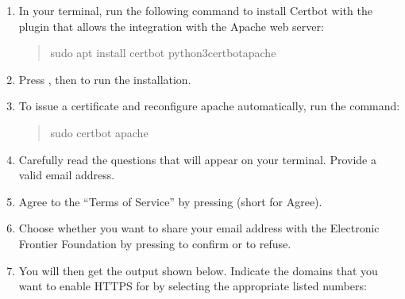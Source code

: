 \documentclass[a4paper,10pt,english,openany,oneside]{sphinxmanual}
\begin{document}
\begin{enumerate}
%
\item {} 
\sphinxAtStartPar
In your terminal, run the following command to install Certbot with the plugin that allows the integration with the Apache web server:
\begin{quote}

\begin{sphinxVerbatim}[commandchars=\\\{\}]
\PYGZdl{} sudo apt install certbot python3\PYGZhy{}certbot\PYGZhy{}apache
\end{sphinxVerbatim}
\end{quote}

\item {} 
\sphinxAtStartPar
Press , then  to run the installation.

\item {} 
\sphinxAtStartPar
To issue a certificate and reconfigure apache automatically, run the command:
\begin{quote}

\begin{sphinxVerbatim}[commandchars=\\\{\}]
\PYGZdl{} sudo certbot \PYGZhy{}\PYGZhy{}apache
\end{sphinxVerbatim}
\end{quote}

\item {} 
\sphinxAtStartPar
Carefully read the questions that will appear on your terminal. Provide a valid email address.

\item {} 
\sphinxAtStartPar
Agree to the “Terms of Service” by pressing  (short for Agree).

\item {} 
\sphinxAtStartPar
Choose whether you want to share your email address with the Electronic Frontier Foundation by pressing  to confirm or  to refuse.

\newpage

\item {} 
\sphinxAtStartPar
You will then get the output shown below. Indicate the domains that you want to enable HTTPS for by selecting the appropriate listed numbers:
\begin{quote}


\end{quote}
\end{enumerate}
\end{document}
